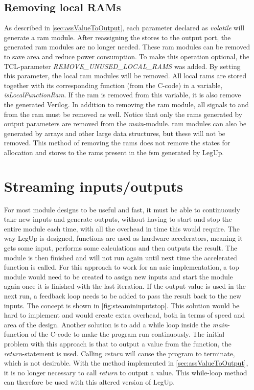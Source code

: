 \subsection{\label{subsec:removerams}Removing local RAMs}
As described in \cref{sec:assValueToOutput}, each parameter declared as \textit{volatile} will generate a \gls{ram} module. After reassigning the stores to the output port, the generated \gls{ram} modules are no longer needed. These \gls{ram} modules can be removed to save area and reduce power consumption. To make this operation optional, the TCL-parameter \textit{REMOVE\_UNUSED\_LOCAL\_RAMS} was added. By setting this parameter, the local \gls{ram} modules will be removed. All local \gls{ram}s are stored together with its corresponding function (from the C-code) in a variable, \textit{isLocalFunctionRam}. If the \gls{ram} is removed from this variable, it is also remove the generated Verilog. In addition to removing the \gls{ram} module, all signals to and from the \gls{ram} must be removed as well. Notice that only the \gls{ram}s generated by output parameters are removed from the \textit{main}-module. \gls{ram} modules can also be generated by arrays and other large data structures, but these will not be removed. This method of removing the \gls{ram}s does not remove the states for allocation and stores to the \gls{ram}s present in the \gls{fsm} generated by LegUp. 

\section{\label{sec:streamingio}Streaming inputs/outputs}
For most module designs to be useful and fast, it must be able to continuously take new inputs and generate outputs, without having to start and stop the entire module each time, with all the overhead in time this would require. The way LegUp is designed, functions are used as hardware accelerators, meaning it gets some input, performs some calculations and then outputs the result. The module is then finished and will not run again until next time the accelerated function is called. For this approach to work for an \gls{asic} implementation, a top module would need to be created to assign new inputs and start the module again once it is finished with the last iteration. If the output-value is used in the next run, a feedback loop needs to be added to pass the result back to the new inputs. The concept is shown in \cref{fig:steamininputstop}. This solution would be hard to implement and would create extra overhead, both in terms of speed and area of the design. Another solution is to add a while loop inside the \textit{main}-function of the C-code to make the program run continuously. The initial problem with this approach is that to output a value from the function, the \textit{return}-statement is used. Calling \textit{return} will cause the program to terminate, which is not desirable. With the method implemented in \cref{sec:assValueToOutput}, it is no longer necessary to call \textit{return} to output a value. This while-loop method can therefore be used with this altered version of LegUp.


